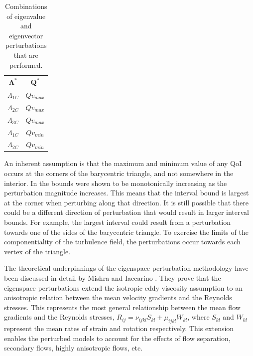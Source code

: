 \begin{table}
\centering
    \def\arraystretch{1.2}
    \begin{tabular}{c|c}
        $\mathbf{\Lambda^*}$ & $\mathbf{Q^*}$ \\\hline
        $\Lambda_{1C}$ & $Qv_{max}$\\
        $\Lambda_{2C}$ & $Qv_{max}$\\
        $\Lambda_{3C}$ & $Qv_{max}$\\
        $\Lambda_{1C}$ & $Qv_{min}$\\
        $\Lambda_{2C}$ & $Qv_{min}$\\
    \end{tabular}
    \caption{Combinations of eigenvalue and eigenvector perturbations that are performed.}
    \label{tab:perts}
\end{table}

An inherent assumption is that the maximum and minimum value of any QoI occurs at the corners of the barycentric triangle, and not somewhere in the interior. In \cite{emory2014visualizing} the bounds were shown to be monotonically increasing as the perturbation magnitude increases. This means that the interval bound is largest at the corner when perturbing along that direction. It is still possible that there could be a different direction of perturbation that would result in larger interval bounds. For example, the largest interval could result from a perturbation towards one of the sides of the barycentric triangle. To exercise the limits of the componentiality of the turbulence field, the perturbations occur towards each vertex of the triangle. 

The theoretical underpinnings of the eigenspace perturbation methodology have been discussed in detail by Mishra and Iaccarino \cite{mishra_perturbations_2019}. They prove that the eigenspace perturbations extend the isotropic eddy viscosity assumption to an anisotropic relation between the mean velocity gradients and the Reynolds stresses. This represents the most general relationship between the mean flow gradients and the Reynolds stresses, $ R_{ij}=\nu_{ijkl}S_{kl}+\mu_{ijkl}W_{kl}$, where $S_{kl}$ and $W_{kl}$ represent the mean rates of strain and rotation respectively. This extension enables the perturbed models to account for the effects of flow separation, secondary flows, highly anisotropic flows, etc. 

